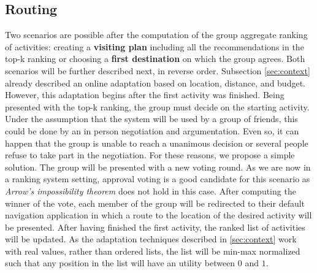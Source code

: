 \documentclass[11pt,a4paper,oneside]{article}
\begin{document}
\subsection{Routing}
\label{sec:routing}
Two scenarios are possible after the computation of the group aggregate ranking of activities: creating a \textbf{visiting plan} including all the recommendations in the top-k ranking or choosing a \textbf{first destination} on which the group agrees. Both scenarios will be further described next, in reverse order. 
Subsection \ref{sec:context} already described an online adaptation based on location, distance, and budget. However, this adaptation begins after the first activity was finished. Being presented with the top-k ranking, the group must decide on the starting activity. Under the assumption that the system will be used by a group of friends, this could be done by an in person negotiation and argumentation. Even so, it can happen that the group is unable to reach a unanimous decision or several people refuse to take part in the negotiation. For these reasons, we propose a simple solution. The group will be presented with a new voting round. As we are now in a ranking system setting, approval voting is a good candidate for this scenario as \emph{Arrow's impossibility theorem} does not hold in this case.\cite[p. 257,267]{shohamMultiagentSystemsAlgorithmic} After computing the winner of the vote, each member of the group will be redirected to their default navigation application in which a route to the location of the desired activity will be presented. After having finished the first activity, the ranked list of activities will be updated. As the adaptation techniques described in \autoref{sec:context} work with real values, rather than ordered lists, the list will be min-max normalized such that any position in the list will have an utility between $0$ and $1$.
\end{document}
